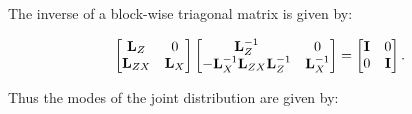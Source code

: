 \documentclass[10pt]{article}
\begin{document}
The inverse of a block-wise triagonal matrix is given by:

\begin{equation*}
\begin{bmatrix} {\bf L}_Z & 0 \\ {\bf L}_{ZX} & {\bf
    L}_{X} \end{bmatrix}
\begin{bmatrix} {\bf L}_Z^{-1} & 0 \\ - {\bf L}_X^{-1} {\bf L}_{ZX}{\bf L}_Z^{-1} & {\bf
    L}_{X}^{-1} \end{bmatrix}
 = 
\begin{bmatrix} {\bf I} & 0 \\0 & {\bf I} \end{bmatrix}.
\end{equation*}

Thus the modes of the joint distribution are given by:
\end{document}
